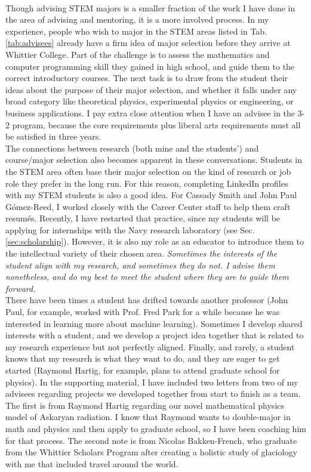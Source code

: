 \documentclass[../../../main.tex]{subfiles}
\begin{document}
\\
\vspace{0.25cm}
Though advising STEM majors is a smaller fraction of the work I have done in the area of advising and mentoring, it is a more involved process.  In my experience, people who wish to major in the STEM areas listed in Tab. \ref{tab:advisees} already have a firm idea of major selection before they arrive at Whittier College.  Part of the challenge is to assess the mathematics and computer programming skill they gained in high school, and guide them to the correct introductory courses.  The next task is to draw from the student their ideas about the purpose of their major selection, and whether it falls under any broad category like theoretical physics, experimental physics or engineering, or business applications.  I pay extra close attention when I have an advisee in the 3-2 program, because the core requirements plus liberal arts requirements must all be satisfied in three years.
\\
\vspace{0.25cm}
The connections between research (both mine and the students') and course/major selection also becomes apparent in these conversations.  Students in the STEM area often base their major selection on the kind of research or job role they prefer in the long run.  For this reason, completing LinkedIn profiles with my STEM students is also a good idea.  For Cassady Smith and John Paul G\'{o}mez-Reed, I worked closely with the Career Center staff to help them craft resum\'{e}s.  Recently, I have restarted that practice, since my students will be applying for internships with the Navy research laboratory (see Sec. \ref{sec:scholarship}).  However, it is also my role as an educator to introduce them to the intellectual variety of their chosen area.  \textit{Sometimes the interests of the student align with my research, and sometimes they do not.  I advise them nonetheless, and do my best to meet the student where they are to guide them forward.}
\vspace{0.25cm}
\\
There have been times a student has drifted towards another professor (John Paul, for example, worked with Prof. Fred Park for a while because he was interested in learning more about machine learning).  Sometimes I develop shared interests with a student, and we develop a project idea together that is related to my research experience but not perfectly aligned.  Finally, and rarely, a student knows that my research is what they want to do, and they are eager to get started (Raymond Hartig, for example, plans to attend graduate school for physics).  In the supporting material, I have included two letters from two of my advisees regarding projects we developed together from start to finish as a team.  The first is from Raymond Hartig regarding our novel mathematical physics model of Askaryan radiation.  I know that Raymond wants to double-major in math and physics and then apply to graduate school, so I have been coaching him for that process.  The second note is from Nicolas Bakken-French, who graduate from the Whittier Scholars Program after creating a holistic study of glaciology with me that included travel around the world.
\end{document}
